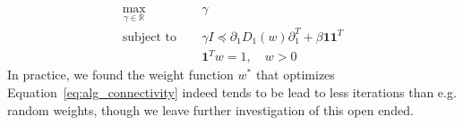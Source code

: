 \documentclass[pdflatex,sn-mathphys-num]{sn-jnl}
\begin{document}
\begin{appendices}
\[\begin{aligned}
\max\limits_{\gamma \in \mathbb{R}}\: & \quad \gamma \\
\text{subject to}\: & \quad \gamma I \preceq \partial_{1}D_{1}(w)\partial_{1}^{T} + \beta\mathbf{1}\mathbf{1}^{T} \\
& \quad\mathbf{1}^{T}w = 1, \quad w > 0
\end{aligned}\]
\noindent In practice, we found the weight function \(w^{\ast}\) that optimizes Equation~\ref{eq:alg_connectivity} indeed tends to be lead to less iterations than e.g. random weights, though we leave further investigation of this open ended.

\end{appendices}


\end{document}
